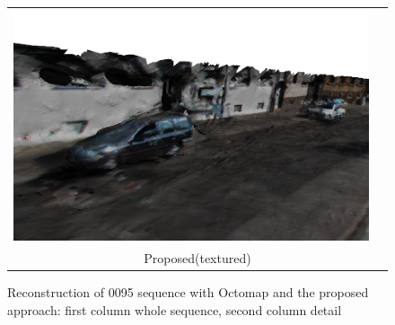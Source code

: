\begin{figure}[tbp]
\begin{tabular}{cc}
    \includegraphics[width=0.45\columnwidth]{./img/ch-laser/proposed0500}\\
    \multicolumn{2}{c}{Proposed(textured)}\\
 \end{tabular}
 \caption{Reconstruction of 0095 sequence with Octomap and the proposed approach: first column whole sequence, second column detail}
 \label{fig:resultOcto01}
\end{figure}


